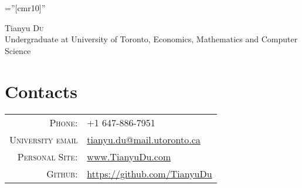 \documentclass[a4paper,10pt]{article}
\begin{document}

\pagestyle{empty} %

\font\fb=''[cmr10]'' %

\par{\centering
		{\Huge Tianyu \textsc{Du} \\
		\small Undergraduate at University of Toronto, Economics, Mathematics and Computer Science
	}\bigskip\par}

\section{Contacts}

\begin{tabular}{rl}
    \textsc{Phone:} & +1 647-886-7951\\
    \textsc{University email} & \href{mailto:tianyu.du@mail.utoronto.ca}{tianyu.du@mail.utoronto.ca} \\
    \textsc{Personal Site:} & \href{www.tianyudu.com}{www.TianyuDu.com} \\
    \textsc{Github:} & \href{https://github.com/TianyuDu}{https://github.com/TianyuDu}
\end{tabular}
\end{document}
